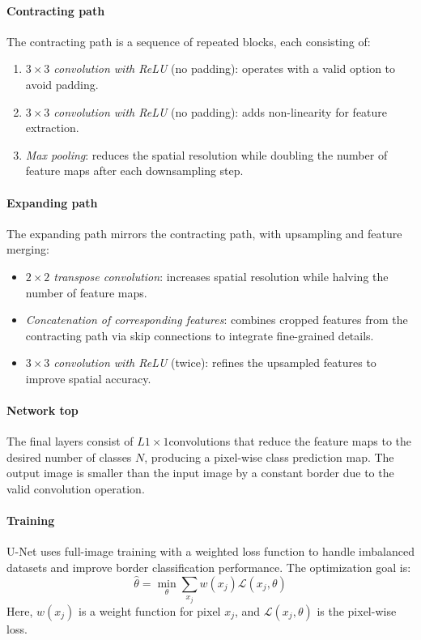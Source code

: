 \paragraph*{Contracting path}
The contracting path is a sequence of repeated blocks, each consisting of:
\begin{enumerate}
    \item \textit{$3 \times 3$ convolution with ReLU} (no padding): operates with a valid option to avoid padding.
    \item \textit{$3 \times 3$ convolution with ReLU} (no padding): adds non-linearity for feature extraction.
    \item \textit{Max pooling}: reduces the spatial resolution while doubling the number of feature maps after each downsampling step.
\end{enumerate}

\paragraph*{Expanding path}
The expanding path mirrors the contracting path, with upsampling and feature merging:
\begin{itemize}
    \item \textit{$2\times 2$ transpose convolution}: increases spatial resolution while halving the number of feature maps.
    \item \textit{Concatenation of corresponding features}: combines cropped features from the contracting path via skip connections to integrate fine-grained details.
    \item \textit{$3 \times 3$ convolution with ReLU} (twice): refines the upsampled features to improve spatial accuracy.
\end{itemize}

\paragraph*{Network top}
The final layers consist of $L 1\times 1$convolutions that reduce the feature maps to the desired number of classes $N$, producing a pixel-wise class prediction map.
The output image is smaller than the input image by a constant border due to the valid convolution operation.

\paragraph*{Training}
U-Net uses full-image training with a weighted loss function to handle imbalanced datasets and improve border classification performance.
The optimization goal is:
\[\hat{\theta}=\min_\theta\sum_{x_j}w(x_j)\mathcal{L}(x_j,\theta)\]
Here, $w(x_j)$ is a weight function for pixel $x_j$, and $\mathcal{L}(x_j,\theta)$ is the pixel-wise loss.


